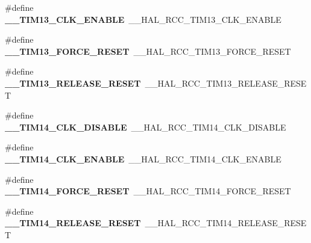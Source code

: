 \begin{DoxyCompactItemize}
\item 
\#define {\bfseries \+\_\+\+\_\+\+T\+I\+M13\+\_\+\+C\+L\+K\+\_\+\+E\+N\+A\+B\+LE}~\+\_\+\+\_\+\+H\+A\+L\+\_\+\+R\+C\+C\+\_\+\+T\+I\+M13\+\_\+\+C\+L\+K\+\_\+\+E\+N\+A\+B\+LE\hypertarget{group___h_a_l___r_c_c___aliased_gaad8f664f4f9f4425f5ca94591107a7a7}{}\label{group___h_a_l___r_c_c___aliased_gaad8f664f4f9f4425f5ca94591107a7a7}

\item 
\#define {\bfseries \+\_\+\+\_\+\+T\+I\+M13\+\_\+\+F\+O\+R\+C\+E\+\_\+\+R\+E\+S\+ET}~\+\_\+\+\_\+\+H\+A\+L\+\_\+\+R\+C\+C\+\_\+\+T\+I\+M13\+\_\+\+F\+O\+R\+C\+E\+\_\+\+R\+E\+S\+ET\hypertarget{group___h_a_l___r_c_c___aliased_ga93a1ee53bfd837e622370714d258835e}{}\label{group___h_a_l___r_c_c___aliased_ga93a1ee53bfd837e622370714d258835e}

\item 
\#define {\bfseries \+\_\+\+\_\+\+T\+I\+M13\+\_\+\+R\+E\+L\+E\+A\+S\+E\+\_\+\+R\+E\+S\+ET}~\+\_\+\+\_\+\+H\+A\+L\+\_\+\+R\+C\+C\+\_\+\+T\+I\+M13\+\_\+\+R\+E\+L\+E\+A\+S\+E\+\_\+\+R\+E\+S\+ET\hypertarget{group___h_a_l___r_c_c___aliased_ga6f650b47d31086ec19b1c1a146124930}{}\label{group___h_a_l___r_c_c___aliased_ga6f650b47d31086ec19b1c1a146124930}

\item 
\#define {\bfseries \+\_\+\+\_\+\+T\+I\+M14\+\_\+\+C\+L\+K\+\_\+\+D\+I\+S\+A\+B\+LE}~\+\_\+\+\_\+\+H\+A\+L\+\_\+\+R\+C\+C\+\_\+\+T\+I\+M14\+\_\+\+C\+L\+K\+\_\+\+D\+I\+S\+A\+B\+LE\hypertarget{group___h_a_l___r_c_c___aliased_gae9d1d7754509af407addaa6e96e35e95}{}\label{group___h_a_l___r_c_c___aliased_gae9d1d7754509af407addaa6e96e35e95}

\item 
\#define {\bfseries \+\_\+\+\_\+\+T\+I\+M14\+\_\+\+C\+L\+K\+\_\+\+E\+N\+A\+B\+LE}~\+\_\+\+\_\+\+H\+A\+L\+\_\+\+R\+C\+C\+\_\+\+T\+I\+M14\+\_\+\+C\+L\+K\+\_\+\+E\+N\+A\+B\+LE\hypertarget{group___h_a_l___r_c_c___aliased_ga17ea8a6c97269b92eb4c267565e1504c}{}\label{group___h_a_l___r_c_c___aliased_ga17ea8a6c97269b92eb4c267565e1504c}

\item 
\#define {\bfseries \+\_\+\+\_\+\+T\+I\+M14\+\_\+\+F\+O\+R\+C\+E\+\_\+\+R\+E\+S\+ET}~\+\_\+\+\_\+\+H\+A\+L\+\_\+\+R\+C\+C\+\_\+\+T\+I\+M14\+\_\+\+F\+O\+R\+C\+E\+\_\+\+R\+E\+S\+ET\hypertarget{group___h_a_l___r_c_c___aliased_gae83b078b087527043d44dcb3c00b2396}{}\label{group___h_a_l___r_c_c___aliased_gae83b078b087527043d44dcb3c00b2396}

\item 
\#define {\bfseries \+\_\+\+\_\+\+T\+I\+M14\+\_\+\+R\+E\+L\+E\+A\+S\+E\+\_\+\+R\+E\+S\+ET}~\+\_\+\+\_\+\+H\+A\+L\+\_\+\+R\+C\+C\+\_\+\+T\+I\+M14\+\_\+\+R\+E\+L\+E\+A\+S\+E\+\_\+\+R\+E\+S\+ET\hypertarget{group___h_a_l___r_c_c___aliased_gadb150e0f413bbb69889b787e2633254b}{}\label{group___h_a_l___r_c_c___aliased_gadb150e0f413bbb69889b787e2633254b}


\end{DoxyCompactItemize}

